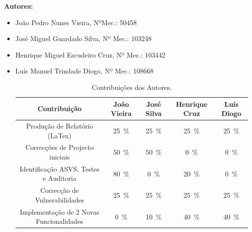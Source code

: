         \textbf{Autores:}
        \begin{itemize}
            \item João Pedro Nunes Vieira, NºMec.: 50458
            \item José Miguel Guardado Silva, Nº Mec.: 103248
            \item Henrique Miguel Escudeiro Cruz, Nº Mec.: 103442
            \item Luís Manuel Trindade Diogo, Nº Mec.: 108668

        \begin{table}[H]
            \centering
            \caption{Contribuições dos Autores.}
            \small
            \begin{tabular}{|c|c|c|c|c|}\hline
                Contribuição & João Vieira & José Silva & Henrique Cruz & Luís Diogo  \\ 
                \hline
        	    Produção de Relatório (LaTex)                           & 25~\% & 25~\% & 25~\% & 25~\% \\
			    Correcções de Projecto iniciais           				& 50~\% & 50~\% & 0~\% & 0~\% \\                
                Identificação ASVS, Testes e Auditoria    				& 80~\% & 0~\% & 20~\% & 0~\% \\
                Correcção de Vulnerabilidades           				& 25~\% & 25~\% & 25~\% & 25~\% \\
                Implementação de 2 Novas Funcionalidades          	    & 0~\% & 10~\% & 40~\% & 40~\% \\  
            \hline
            \end{tabular}
            \label{tab.contribuições}
        \end{table}	
        
        
        \end{itemize}

